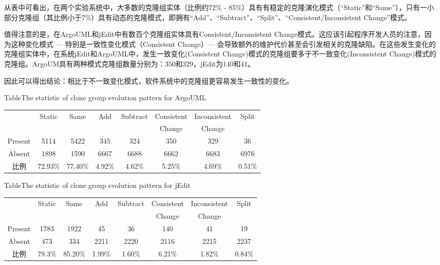 从表中可看出，在两个实验系统中，大多数的克隆组实体（比例约72\% - 85\%）具有有稳定的克隆演化模式（“Static”和“Same”），只有一小部分克隆组（其比例小于7\%）具有动态的克隆模式，即拥有“Add”、“Subtract”、“Split”、“Consistent/Inconsistent Change”模式。

值得注意的是，在ArgoUML和jEdit中有数百个克隆组实体具有Consistent/Inconsistent Change模式。这应该引起程序开发人员的注意，因为这种变化模式 --- 特别是一致性变化模式（Consistent Change）--- 会导致额外的维护代价甚至会引发相关的克隆缺陷。在这些发生变化的克隆组实体中，在系统jEdit和ArgoUML中，发生一致变化(Consistent Change)模式的克隆组要多于不一致变化(Inconsistent Change)模式的克隆组。ArgoUM具有两种模式克隆组数量分别为：$350$和$329$，jEdit为$140$和$41$。

因此可以得出结论：相比于不一致变化模式，软件系统中的克隆组更容易发生一致性的变化。

\begin{table}[htbp]
{Table$\!$}{The statistic of clone group evolution pattern for ArgoUML}
\vspace{0.5em}
\centering
\wuhao
\begin{tabular}{cccccccc}
\toprule[1.5pt]
~&\multirow{2}{*}{Static}&\multirow{2}{*}{Same}&\multirow{2}{*}{Add}&\multirow{2}{*}{Subtract}&Consistent&Inconsistent&\multirow{2}{*}{Split}\\ 
~&&&&&Change&Change&\\ 
\midrule[1pt]
Present	&5114	&5422	&345	&324	&350	&329	&36\\ 
Absent	&1898	&1590	&6667	&6688	&6662	&6683	&6976\\ 
比例	&72.93\%	&77.40\%	&4.92\%	&4.62\%	&5.25\%	&4.69\%	&0.51\%\\ 
\bottomrule[1.5pt]
\end{tabular}
\end{table}

\begin{table}[htbp]
{Table$\!$}{The statistic of clone group evolution pattern for jEdit}
\vspace{0.5em}
\centering
\wuhao
\begin{tabular}{cccccccc}
\toprule[1.5pt]
~&\multirow{2}{*}{Static}&\multirow{2}{*}{Same}&\multirow{2}{*}{Add}&\multirow{2}{*}{Subtract}&Consistent&Inconsistent&\multirow{2}{*}{Split}\\ 
~&&&&&Change&Change&\\ 
\midrule[1pt]
Present	&1783	&1922	&45	&36	&140	&41	&19\\ 
Absent	&473	&334	&2211	&2220	&2116	&2215	&2237\\ 
比例	&79.3\%	&85.20\%	&1.99\%	&1.60\%	&6.21\%	&1.82\%	&0.84\%\\ 
\bottomrule[1.5pt]
\end{tabular}
\end{table}

